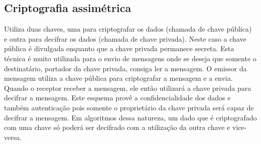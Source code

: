 \subsection{Criptografia assimétrica}
Utiliza duas chaves, uma para criptografar os dados (chamada de chave pública) e outra para decifrar os dados (chamada de chave privada). Neste caso a chave pública é divulgada enquanto que a chave privada permanece secreta. Esta técnica é muito utilizada para o envio de mensagens onde se deseja que somente o destinatário, portador da chave privada, consiga ler a mensagem. O emissor da mensagem utiliza a chave pública para criptografar a mensagem e a envia. Quando o receptor receber a mensagem, ele então utilizará a chave privada para decifrar a mensagem. Este esquema provê a confidencialidade dos dados e também autenticação pois somente o proprietário da chave privada será capaz de decifrar a mensagem. Em algoritmos dessa natureza, um dado que é criptografado com uma chave só poderá ser decifrado com a utilização da outra chave e vice-versa.
